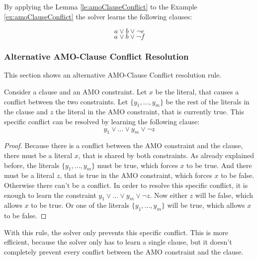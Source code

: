 By applying the Lemma \ref{le:amoClauseConflict} to the Example \ref{ex:amoClauseConflict} the solver learns the following clauses:

\begin{leftbar}
\begin{displaymath}
a \vee b \vee \neg e
\end{displaymath}
\begin{displaymath}
a \vee b \vee \neg f
\end{displaymath}
\end{leftbar}

\subsubsection{Alternative AMO-Clause Conflict Resolution}
This section shows an alternative AMO-Clause Conflict resolution rule.

\begin{lemma}
\begin{leftbar}
Consider a clause and an AMO constraint. Let $x$ be the literal, that causes a conflict between the two constraints. Let $\{y_1,...,y_m\}$ be the rest of the literals in the clause and $z$ the literal in the AMO constraint, that is currently true. This specific conflict can be resolved by learning the following clause:
\begin{displaymath}
y_1 \vee ... \vee y_m \vee \neg z
\end{displaymath}
\end{leftbar}
\end{lemma}

\begin{proof}
Because there is a conflict between the AMO constraint and the clause, there must be a literal $x$, that is shared by both constraints. As already explained before, the literals $\{y_1,...,y_m\}$ must be true, which forces $x$ to be true. And there must be a literal $z$, that is true in the AMO constraint, which forces $x$ to be false. Otherwise there can't be a conflict. In order to resolve this specific conflict, it is enough to learn the constraint $y_1 \vee ... \vee y_m \vee \neg z$. Now either $z$ will be false, which allows $x$ to be true. Or one of the literals $\{y_1,...,y_m\}$ will be true, which allows $x$ to be false.
\end{proof}

With this rule, the solver only prevents this specific conflict. This is more efficient, because the solver only has to learn a single clause, but it doesn't completely prevent every conflict between the AMO constraint and the clause.

